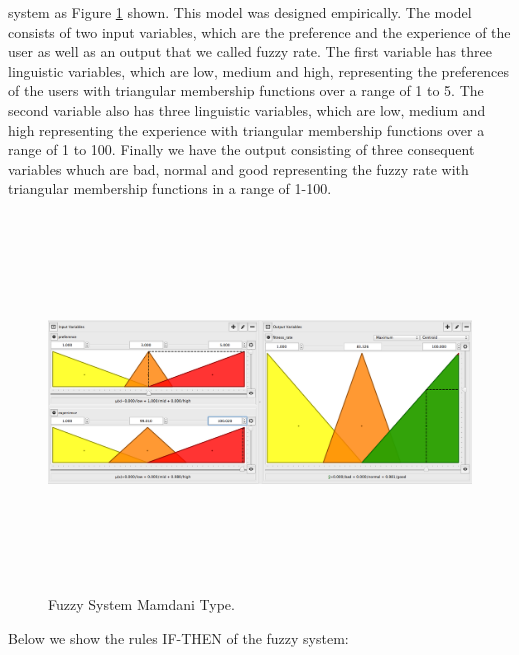 system \cite{mamdani1975experiment} \cite{mamdani1974application} as Figure
\ref{fig:fis01} shown. This model was designed empirically. The model consists
of two input variables, which are the preference and the experience of the user
as well as an output that we called fuzzy rate. The first variable has three
linguistic variables, which are low, medium and high, representing the
preferences of the users with triangular membership functions over a range of 1
to 5. The second variable also has three linguistic variables, which are low, medium
and high representing the experience with triangular membership functions over a
range of 1 to 100. Finally we have the output consisting of three consequent
variables whuch are bad, normal and good representing the fuzzy rate with triangular
membership functions in a range of 1-100.
\begin{figure}
\captionsetup{justification=centering,margin=2cm}
\centering
\setlength\fboxsep{0pt}
\setlength\fboxrule{0.7pt}
\includegraphics[width=12cm,height=10cm,keepaspectratio]{img/fuzzy_system_2_1.png}
\caption{Fuzzy System Mamdani Type.}
\label{fig:fis01}
\end{figure}

Below we show the rules IF-THEN of the fuzzy system:

